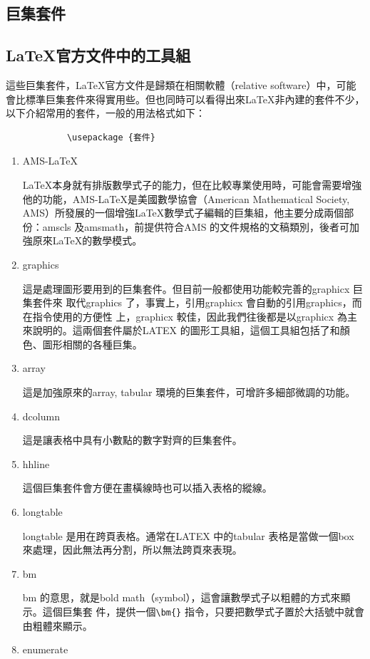 \documentclass[12pt,a4paper]{report}
\begin{document}
\begin{CJK}{UTF8}{bkai}
\chapter{巨集套件}
\section{\LaTeX 官方文件中的工具組}
這些巨集套件，\LaTeX 官方文件是歸類在相關軟體（relative software）中，可能會比標準巨集套件來得實用些。但也同時可以看得出來\LaTeX 非內建的套件不少，以下介紹常用的套件，一般的用法格式如下：

		\begin{framed}
			\begin{verbatim}
			\usepackage {套件}
			\end{verbatim}
		\end{framed}

\begin{enumerate}
\item  AMS-\LaTeX

\LaTeX 本身就有排版數學式子的能力，但在比較專業使用時，可能會需要增強他的功能，AMS-\LaTeX 是美國數學協會（American Mathematical Society, AMS）所發展的一個增強\LaTeX 數學式子編輯的巨集組，他主要分成兩個部份：amscls 及amsmath，前提供符合AMS 的文件規格的文稿類別，後者可加強原來\LaTeX 的數學模式。

\item graphics

這是處理圖形要用到的巨集套件。但目前一般都使用功能較完善的graphicx 巨集套件來
取代graphics 了，事實上，引用graphicx 會自動的引用graphics，而在指令使用的方便性
上，graphicx 較佳，因此我們往後都是以graphicx 為主來說明的。這兩個套件屬於LATEX
的圖形工具組，這個工具組包括了和顏色、圖形相關的各種巨集。
\item array

這是加強原來的array, tabular 環境的巨集套件，可增許多細部微調的功能。
\item dcolumn

這是讓表格中具有小數點的數字對齊的巨集套件。
\item hhline

這個巨集套件會方便在畫橫線時也可以插入表格的縱線。
\item longtable

longtable 是用在跨頁表格。通常在LATEX 中的tabular 表格是當做一個box 來處理，因此無法再分割，所以無法跨頁來表現。
\item bm

bm 的意思，就是bold math（symbol），這會讓數學式子以粗體的方式來顯示。這個巨集套
件，提供一個\verb|\bm{}| 指令，只要把數學式子置於大括號中就會由粗體來顯示。
\item enumerate


\end{enumerate}
\end{CJK}
\end{document}

